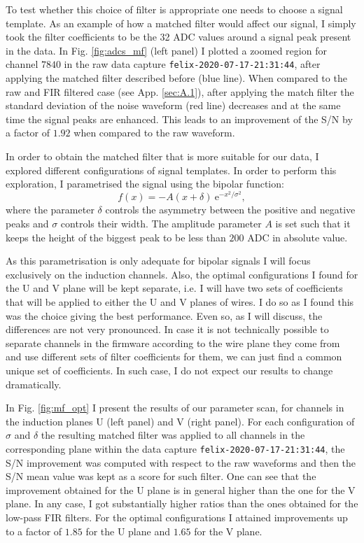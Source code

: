 To test whether this choice of filter is appropriate one needs to choose a signal template. As an example of how a matched filter would affect our signal, I simply took the filter coefficients to be the 32 ADC values around a signal peak present in the data. In Fig. \ref{fig:adcs_mf} (left panel) I plotted a zoomed region for channel $7840$ in the raw data capture \texttt{felix-2020-07-17-21:31:44}, after applying the matched filter described before (blue line). When compared to the raw and FIR filtered case (see App. \ref{sec:A.1}), after applying the match filter the standard deviation of the noise waveform (red line) decreases and at the same time the signal peaks are enhanced. This leads to an improvement of the S/N by a factor of $1.92$ when compared to the raw waveform.

In order to obtain the matched filter that is more suitable for our data, I explored different configurations of signal templates. In order to perform this exploration, I parametrised the signal using the bipolar function:
\begin{equation}\label{2.4.13}
	f(x) = -A (x + \delta) \ \mathrm{e}^{-x^{2}/\sigma^{2}},
\end{equation}
where the parameter $\delta$ controls the asymmetry between the positive and negative peaks and $\sigma$ controls their width. The amplitude parameter $A$ is set such that it keeps the height of the biggest peak to be less than $200$ ADC in absolute value.

As this parametrisation is only adequate for bipolar signals I will focus exclusively on the induction channels. Also, the optimal configurations I found for the U and V plane will be kept separate, i.e. I will have two sets of coefficients that will be applied to either the U and V planes of wires. I do so as I found this was the choice giving the best performance. Even so, as I will discuss, the differences are not very pronounced. In case it is not technically possible to separate channels in the firmware according to the wire plane they come from and use different sets of filter coefficients for them, we can just find a common unique set of coefficients. In such case, I do not expect our results to change dramatically.

In Fig. \ref{fig:mf_opt} I present the results of our parameter scan, for channels in the induction planes U (left panel) and V (right panel). For each configuration of $\sigma$ and $\delta$ the resulting matched filter was applied to all channels in the corresponding plane within the data capture \texttt{felix-2020-07-17-21:31:44}, the S/N improvement was computed with respect to the raw waveforms and then the S/N mean value was kept as a score for such filter. One can see that the improvement obtained for the U plane is in general higher than the one for the V plane. In any case, I got substantially higher ratios than the ones obtained for the low-pass FIR filters. For the optimal configurations I attained improvements up to a factor of $1.85$ for the U plane and $1.65$ for the V plane.

